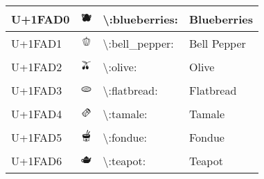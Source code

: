 \begin{table}[h]
\begin{tabulary}{\linewidth}{|L|L|L|L|}
\hline
U+1FAD0 & 🫐 & {\textbackslash}:blueberries: & Blueberries \\
\hline
U+1FAD1 & 🫑 & {\textbackslash}:bell\_pepper: & Bell Pepper \\
\hline
U+1FAD2 & 🫒 & {\textbackslash}:olive: & Olive \\
\hline
U+1FAD3 & 🫓 & {\textbackslash}:flatbread: & Flatbread \\
\hline
U+1FAD4 & 🫔 & {\textbackslash}:tamale: & Tamale \\
\hline
U+1FAD5 & 🫕 & {\textbackslash}:fondue: & Fondue \\
\hline
U+1FAD6 & 🫖 & {\textbackslash}:teapot: & Teapot \\
\hline
\end{tabulary}

\end{table}
